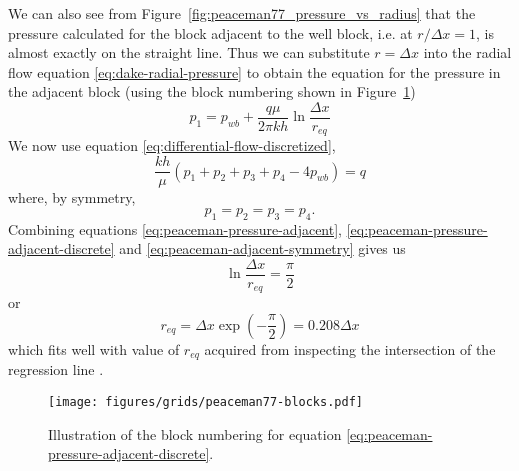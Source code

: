 We can also see from Figure~\ref{fig:peaceman77_pressure_vs_radius} that the pressure calculated for the block adjacent to the well block, i.e. at $r/\Delta x=1$, is almost exactly on the straight line. Thus we can substitute $r=\Delta x$ into the radial flow equation \eqref{eq:dake-radial-pressure} to obtain the equation for the pressure in the adjacent block (using the block numbering shown in Figure~\ref{fig:peaceman-block-numbering})
\begin{equation}
    \label{eq:peaceman-pressure-adjacent}
    p_1 = p_{wb} + \frac{q\mu}{2\pi kh} \ln{\frac{\Delta x}{r_{eq}}}
\end{equation}
We now use equation \eqref{eq:differential-flow-discretized},
\begin{equation}
    \label{eq:peaceman-pressure-adjacent-discrete}
    \frac{kh}{\mu} \left( p_1 + p_2 + p_3 + p_4 -4p_{wb}  \right) = q
\end{equation}
where, by symmetry,
\begin{equation}
    \label{eq:peaceman-adjacent-symmetry}
    p_1=p_2=p_3=p_4.
\end{equation}
Combining equations \eqref{eq:peaceman-pressure-adjacent}, \eqref{eq:peaceman-pressure-adjacent-discrete} and \eqref{eq:peaceman-adjacent-symmetry} gives us
\begin{equation}
    \ln{\frac{\Delta x}{r_{eq}}} = \frac{\pi}{2}
\end{equation}
or
\begin{equation}
    r_{eq} = \Delta x \exp{\left( -\frac{\pi}{2} \right)} = 0.208 \Delta x
\end{equation}
which fits well with value of $r_{eq}$ acquired from inspecting the intersection of the regression line \cite{Peaceman1978Interpretation}.

\begin{figure}[htb]
    \centering
    \texttt{[image: figures/grids/peaceman77-blocks.pdf]}
    \caption{Illustration of the block numbering for equation \eqref{eq:peaceman-pressure-adjacent-discrete}.}
    \label{fig:peaceman-block-numbering}
\end{figure}







